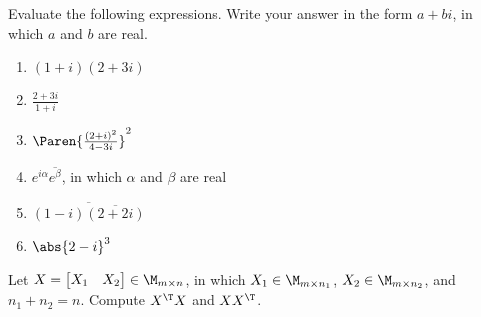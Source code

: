 \documentclass{homework}
\begin{document}
\begin{problem}[P.A.2]
  Evaluate the following expressions.  Write your answer in
  the form \(a+bi\), in which \(a\) and \(b\) are real.
  \begin{enumerate}
  \item \((1+i)(2+3i)\)

    \begin{solution}
    \end{solution}

  \item \(\frac{2+3i}{1+i}\)

    \begin{solution}
    \end{solution}

  \item \(\Paren{\frac{(2+i)^2}{4-3i}}^2\)

    \begin{solution}
    \end{solution}

  \item \(e^{i\alpha} \overline{e^{\beta}}\), in which \(\alpha\) and
    \(\beta\) are real

    \begin{solution}
    \end{solution}

  \item \(\overline{(1-i) \overline{(2+2i)}}\)

    \begin{solution}
    \end{solution}

  \item \(\abs{2-i}^3\)

    \begin{solution}
    \end{solution}

  \end{enumerate}
\end{problem}

\begin{problem}[P.3.3]
  Let \(X = \begin{bmatrix}X_1&X_2\end{bmatrix} \in \M_{m\times n}\),
  in which \(X_1 \in \M_{m\times n_1}\), \(X_2 \in \M_{m\times n_2}\),
  and \(n_1 + n_2 = n\).  Compute \(X^\T X\) and \(X X^\T\).

  \begin{solution}
  \end{solution}

\end{problem}
\end{document}
